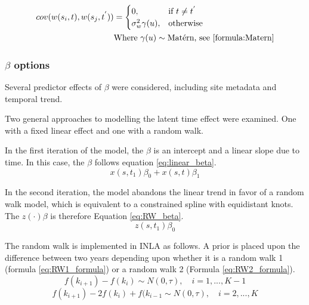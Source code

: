 \documentclass{article}
\begin{document}
\begin{align} \label{eq:cov_structure}
    cov(w(s_i,t), w(s_j,t^{'})) &=
        \begin{cases} 
            0, & \text{if } t \neq t^{'} \\
            \sigma^2_w \gamma(u), & \text{otherwise}    
        \end{cases} \\
    & \text{Where } \gamma(u) \sim \text{Mat\'{e}rn, see \ref{formula:Matern}} \nonumber
\end{align} 

\subsubsection*{$\beta$ options}
\label{subsubsec:betaopts}
Several predictor effects of $\beta$ were considered, including site metadata and temporal trend.

Two general approaches to modelling the latent time effect were examined.  One with a fixed linear effect and one with a random walk.

In the first iteration of the model, the $\beta$ is an intercept and a linear slope due to time.  In this case, the $\beta$ follows equation \ref{eq:linear_beta}.
\begin{equation} \label{eq:linear_beta} 
    x(s,t_1)\beta_0 + x(s,t)\beta_1
\end{equation}  

In the second iteration, the model abandons the linear trend in favor of a random walk model, which is equivalent to a constrained spline with equidistant knots.  The $z(\cdot)\beta$ is therefore Equation \ref{eq:RW_beta}.
\begin{equation} \label{eq:RW_beta}
    z(s,t_1)\beta_0
\end{equation}

The random walk is implemented in \ac{INLA} as follows.  A prior is placed upon the difference between two years depending upon whether it is a random walk 1 (formula \ref{eq:RW1_formula}) or a random walk 2 (Formula \ref{eq:RW2_formula}).
\begin{equation} \label{eq:RW1_formula}
    f(k_{i + 1}) - f(k_i) \sim N(0,\tau), \quad i = 1, ..., K-1
\end{equation}
\begin{equation} \label{eq:RW2_formula}
    f(k_{i+1}) - 2f(k_i) + f(k_{i-1} \sim N(0, \tau), \quad i = 2, ..., K
\end{equation}
\end{document}
